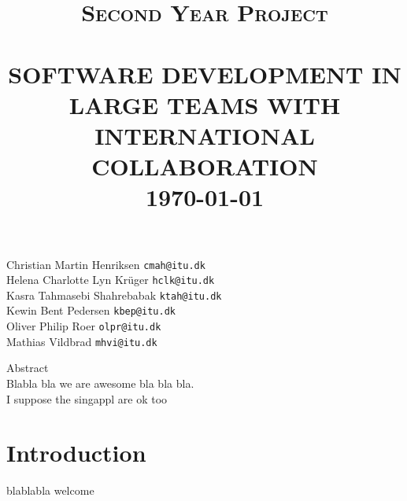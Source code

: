 \documentclass[10pt,a4paper]{article}
\title{\LARGE \textsc{Second Year Project} 	%
		 	\\[2.0cm]													%
			\HRule{0.5pt} \\										%
			\LARGE \textbf{\uppercase{Software Development in Large Teams with International Collaboration}}	%
			\HRule{2pt} \\ [0.5cm]								%
			\normalsize \today		 %
			\\[3.0cm]							
		}
\makeatletter
\def\printtitle{%
    {\centering \@title\par}}
\makeatother
\begin{document}
\thispagestyle{empty}				%

\printtitle									%

{
\center 
Christian Martin Henriksen \texttt{cmah@itu.dk} \\ [0.5cm]
Helena Charlotte Lyn Krüger \texttt{hclk@itu.dk} \\ [0.5cm]
Kasra Tahmasebi Shahrebabak \texttt{ktah@itu.dk} \\ [0.5cm]
Kewin Bent Pedersen \texttt{kbep@itu.dk} \\ [0.5cm]
Oliver Philip Roer \texttt{olpr@itu.dk} \\  [0.5cm]
Mathias Vildbrad \texttt{mhvi@itu.dk} \\[0.5cm] 
}

\newpage

\oddsidemargin 0.0in
\textwidth 6.5in

{\large Abstract} \\
Blabla bla we are awesome bla bla bla. \\
I suppose the singappl are ok too
\newpage

\tableofcontents

\newpage
\section{Introduction}
blablabla welcome
\end{document}
